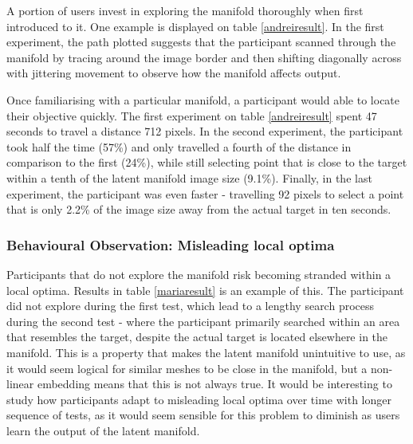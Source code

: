 \documentclass[ %
author={Dillon Keith Diep},
supervisor={Dr. Carl Henrik Ek},
degree={MEng},
title={ART-CG Hair:},
subtitle={Assisted Real-time Content Generation of Stylised Virtual Hair},
type={Research},
year={2017} ]{dissertation}
\begin{document}
A portion of users invest in exploring the manifold thoroughly when first introduced to it. One example is displayed on table \ref{andreiresult}. In the first experiment, the path plotted suggests that the participant scanned through the manifold by tracing around the image border and then shifting diagonally across with jittering movement to observe how the manifold affects output.

Once familiarising with a particular manifold, a participant would able to locate their objective quickly. The first experiment on table \ref{andreiresult} spent 47 seconds to travel a distance 712 pixels. In the second experiment, the participant took half the time (57\%) and only travelled a fourth of the distance in comparison to the first (24\%), while still selecting point that is close to the target within a tenth of the latent manifold image size (9.1\%). Finally, in the last experiment, the participant was even faster - travelling 92 pixels to select a point that is only 2.2\% of the image size away from the actual target in ten seconds.

\subsubsection{Behavioural Observation: Misleading local optima}

Participants that do not explore the manifold risk becoming stranded within a local optima. Results in table \ref{mariaresult} is an example of this. The participant did not explore during the first test, which lead to a lengthy search process during the second test - where the participant primarily searched within an area that resembles the target, despite the actual target is located elsewhere in the manifold. This is a property that makes the latent manifold unintuitive to use, as it would seem logical for similar meshes to be close in the manifold, but a non-linear embedding means that this is not always true. It would be interesting to study how participants adapt to misleading local optima over time with longer sequence of tests, as it would seem sensible for this problem to diminish as users learn the output of the latent manifold.
\end{document}
